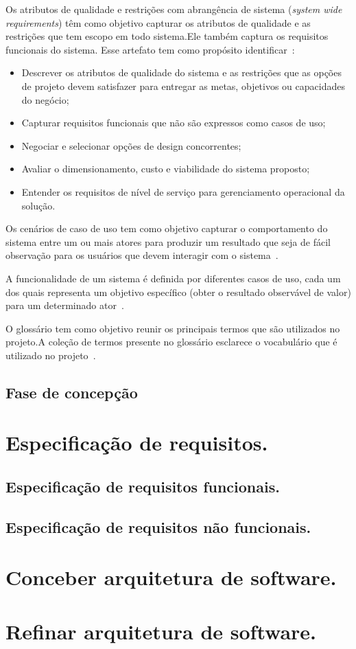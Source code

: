 Os atributos de qualidade e restrições com abrangência de sistema (\emph{system wide requirements}) têm como objetivo  capturar os atributos de qualidade e as restrições que tem escopo em todo sistema.Ele também captura os requisitos funcionais do sistema. Esse artefato tem como propósito identificar~\cite{openup}:

\begin{itemize}
    \item Descrever os atributos de qualidade do sistema e as restrições que as opções de projeto devem satisfazer para entregar as metas, objetivos ou capacidades do negócio;
    \item Capturar requisitos funcionais que não são expressos como casos de uso;
    \item Negociar e selecionar opções de design concorrentes;
    \item Avaliar o dimensionamento, custo e viabilidade do sistema proposto;
    \item Entender os requisitos de nível de serviço para gerenciamento operacional da solução.
\end{itemize}

Os cenários de caso de uso tem como objetivo capturar o comportamento do sistema entre um ou mais atores para produzir um resultado que seja de fácil observação para os usuários que devem interagir com o sistema~\cite{openup}.

A funcionalidade de um sistema é definida por diferentes casos de uso, cada um dos quais representa um objetivo específico (obter o resultado observável de valor) para um determinado ator~\cite{openup}.

O glossário tem como objetivo reunir os principais termos que são utilizados no projeto.A coleção de termos presente no glossário esclarece o vocabulário que é utilizado no projeto~\cite{openup}.    

    
\subsection{Fase de concepção}
\section{Especificação de requisitos.}
\subsection{Especificação de requisitos funcionais.}
\subsection{Especificação de requisitos não funcionais.}
\section{Conceber arquitetura de software.}
\section{Refinar arquitetura de software.}